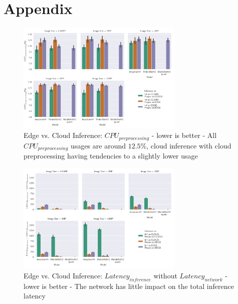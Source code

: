 \appendix
\chapter{Appendix}
\begin{figure}[!htb]
\centering
\includegraphics[width=0.71\textwidth]{./Bilder/single_plots/edge_vs_cloud_plots/Edge_vs_Cloud_Inference_Preprocessing_CPU.pdf}
\caption[Edge vs. Cloud Inference: $CPU_{preprocessing}$ - lower is better]{Edge vs. Cloud Inference: $CPU_{preprocessing}$ - lower is better - 
All $CPU_{preprocessing}$ usages are around $12.5\%$, cloud inference with cloud preprocessing having tendencies to a slightly lower usage}
\label{fig:CloudEdgePreproCPU}
\end{figure}

\begin{figure}[!htb]
\centering
\includegraphics[width=0.71\textwidth]{./Bilder/single_plots/edge_vs_cloud_plots/Edge_vs_Cloud_Inference_Inference_Latencies_WITHOUT_NETWORK.pdf}
\caption{Edge vs. Cloud Inference: $Latency_{inference}$ without $Latency_{network}$ - lower is better - The network has little impact on the total inference latency}
\label{fig:CloudEdgeInfLatWONetwork}
\end{figure}








